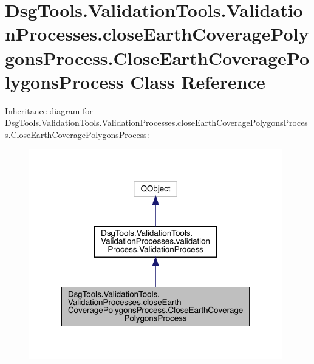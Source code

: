 \hypertarget{class_dsg_tools_1_1_validation_tools_1_1_validation_processes_1_1close_earth_coverage_polygons_pcbfc5684de655aabbd7cec48624aa747}{}\section{Dsg\+Tools.\+Validation\+Tools.\+Validation\+Processes.\+close\+Earth\+Coverage\+Polygons\+Process.\+Close\+Earth\+Coverage\+Polygons\+Process Class Reference}
\label{class_dsg_tools_1_1_validation_tools_1_1_validation_processes_1_1close_earth_coverage_polygons_pcbfc5684de655aabbd7cec48624aa747}


Inheritance diagram for Dsg\+Tools.\+Validation\+Tools.\+Validation\+Processes.\+close\+Earth\+Coverage\+Polygons\+Process.\+Close\+Earth\+Coverage\+Polygons\+Process\+:
\nopagebreak
\begin{figure}[H]
\begin{center}
\leavevmode
\includegraphics[width=312pt]{class_dsg_tools_1_1_validation_tools_1_1_validation_processes_1_1close_earth_coverage_polygons_pd293f9745233a5b5990bc4e5792575a1}
\end{center}
\end{figure}


